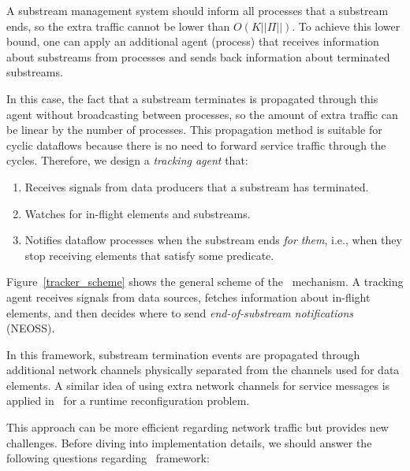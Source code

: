 \label{fs-acker-tracker}


A substream management system should inform all processes that a substream ends, so the extra traffic cannot be lower than $O(K||\Pi||)$. To achieve this lower bound, one can apply an additional agent (process) that receives information about substreams from processes and sends back information about terminated substreams. 

In this case, the fact that a substream terminates is propagated through this agent without broadcasting between processes, so the amount of extra traffic can be linear by the number of processes. This propagation method is suitable for cyclic dataflows because there is no need to forward service traffic through the cycles. Therefore, we design a {\em tracking agent} that:

\begin{enumerate}
    \item Receives signals from data producers that a substream has terminated.
    \item Watches for in-flight elements and substreams.
    \item Notifies dataflow processes when the substream ends {\em for them}, i.e., when they stop receiving elements that satisfy some predicate.
\end{enumerate}

Figure~\ref{tracker_scheme} shows the general scheme of the \tracker\ mechanism. A tracking agent receives signals from data sources, fetches information about in-flight elements, and then decides where to send {\em end-of-substream notifications} (NEOSS).

In this framework, substream termination events are propagated through additional network channels physically separated from the channels used for data elements. A similar idea of using extra network channels for service messages is applied in~\cite{wang2022fries} for a runtime reconfiguration problem.

This approach can be more efficient regarding network traffic but provides new challenges. Before diving into implementation details, we should answer the following questions regarding \tracker\ framework:

